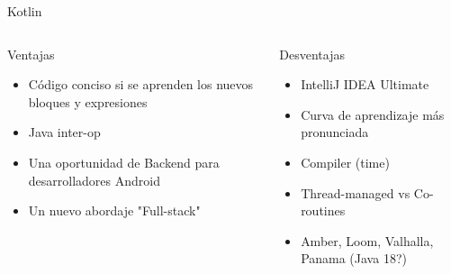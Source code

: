 \documentclass[aspectratio=169]{beamer}
\begin{document}
\begin{frame}{Kotlin}
\begin{columns}

	\begin{column}{0.5\textwidth}
		Ventajas
		\begin{itemize}
			\item Código conciso si se aprenden los nuevos bloques y expresiones
			\item Java inter-op
			\item Una oportunidad de Backend para desarrolladores Android
			\item Un nuevo abordaje "Full-stack"
		\end{itemize}
	\end{column}
	\begin{column}{0.5\textwidth}
		Desventajas
		\begin{itemize}
			\item IntelliJ IDEA Ultimate
			\item Curva de aprendizaje más pronunciada
			\item Compiler (time)
			\item Thread-managed vs Co-routines
			\item Amber, Loom, Valhalla, Panama (Java 18?)
		\end{itemize}
	\end{column}
\end{columns}
\end{frame}
\end{document}
